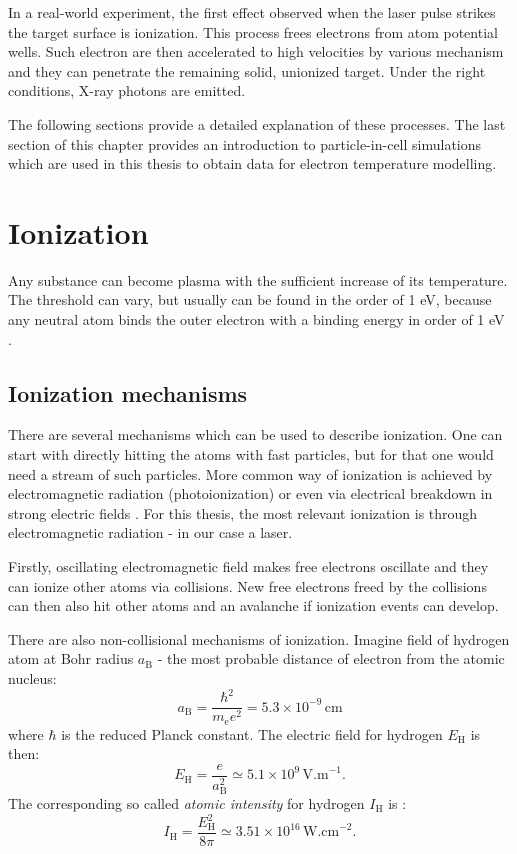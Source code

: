 In a real-world experiment, the first effect observed when the laser pulse strikes the target surface is ionization. This process frees electrons from atom potential wells. Such electron are then accelerated to high velocities by various mechanism and they can penetrate the remaining solid, unionized target. Under the right conditions, X-ray photons are emitted.

The following sections provide a detailed explanation of these processes. The last section of this chapter provides an introduction to particle-in-cell simulations which are used in this thesis to obtain data for electron temperature modelling.

\section{Ionization}
Any substance can become plasma with the sufficient increase of its temperature. The threshold can vary, but usually can be found in the order of 1 eV, because any neutral atom binds the outer electron with a binding energy in order of 1 eV \cite{laser-plasma1}. 

\subsection*{Ionization mechanisms}
There are several mechanisms which can be used to describe ionization. One can start with directly hitting the atoms with fast particles, but for that one would need a stream of such particles. More common way of ionization is achieved by electromagnetic radiation (photoionization) or even via electrical breakdown in strong electric fields \cite{plasma-intro}. For this thesis, the most relevant ionization is through electromagnetic radiation - in our case a laser.

Firstly, oscillating electromagnetic field makes free electrons oscillate and they can ionize other atoms via collisions. New free electrons freed by the collisions can then also hit other atoms and an avalanche if ionization events can develop.

There are also non-collisional mechanisms of ionization. Imagine field of hydrogen atom at Bohr radius $a_\mathrm{B}$ - the most probable distance of electron from the atomic nucleus:
\begin{equation}
	a_\mathrm{B} = \frac{\hbar^2}{m_\mathrm{e}e^2} = 5.3 \times 10^{-9} \, \mathrm{ cm}
\end{equation}
\noindent where $\hbar$ is the reduced Planck constant.
The electric field for hydrogen $E_{\mathrm{H}}$ is then:
\begin{equation}
	E_{\mathrm{H}} = \frac{e}{a_\mathrm{B}^2} \simeq 5.1 \times 10^{9} \, \mathrm{V.m}^{-1}.
\end{equation}
\noindent The corresponding so called \textit{atomic intensity} for hydrogen $I_{\mathrm{H}}$ is \cite{plasma-intro}:
\begin{equation}
	I_{\mathrm{H}} = \frac{E_{\mathrm{H}}^2}{8\pi} \simeq 3.51 \times 10^{16} \, \mathrm{W.cm}^{-2}.
\end{equation}

